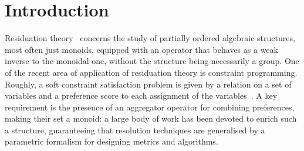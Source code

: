\documentclass[a4paper]{elsarticle}
\newcommand{\1}{\mathbf{1}}
\begin{document}
\section{Introduction}\label{sec:intro}
Residuation theory~\cite{residuation} concerns the study of partially ordered algebraic structures, most often just monoids, 
equipped with an operator that behaves as a weak inverse to the monoidal one, without the structure being necessarily a group.
%
One of the recent area of application of residuation theory is constraint programming. 
%
Roughly, a soft constraint satisfaction problem
is given by a relation on a set of variables and a preference 
score to each assignment of the variables~\cite{jacm97,schiex}. 
%
A key requirement is the presence of an aggregator operator for combining preferences, making their set a monoid: a large body 
of work has been devoted to enrich such a structure, guaranteeing that resolution techniques are generalised by 
a parametric formalism for designing metrics and algorithms.
%
\end{document}
